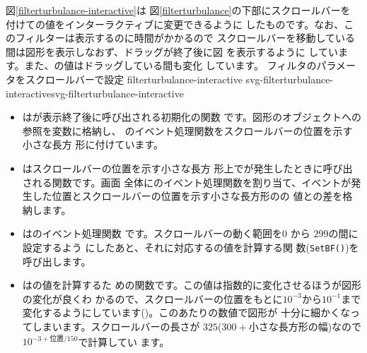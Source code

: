    
図\ref{filterturbulance-interactive}は
図\ref{filterturbulance}の下部にスクロールバーを
付けての値をインターラクティブに変更できるように
したものです。なお、このフィルターは表示するのに時間がかかるので
スクロールバーを移動している間は図形を表示しなおず、ドラッグが終了後に図
を表示するように
しています。また、の値はドラッグしている間も変化
しています。
{フィルタのパラメータをスクロールバーで設定}
{filterturbulance-interactive}
{svg-filterturbulance-interactive}{svg-filterturbulance-interactive}
\begin{itemize}
 \item {}は\SVG が表示終了後に呼び出される初期化の関数
       です。図形のオブジェクトへの参照を変数に格納し、
       のイベント処理関数をスクロールバーの位置を示す小さな長方
       形に付けています。
 \item {}はスクロールバーの位置を示す小さな長方
       形上でが発生したときに呼び出される関数です。画面
       全体にのイベント処理関数を割り当て、イベントが発
       生した位置とスクロールバーの位置を示す小さな長方形のの
       値との差を格納します。
 \item {}はのイベント処理関数
       です。スクロールバーの動く範囲を$0$ から $299$の間に設定するよう
       にしたあと、それに対応するの値を計算する関
       数(\texttt{SetBF()})を呼び出します。
 \item {}はの値を計算するた
       めの関数です。この値は指数的に変化させるほうが図形の変化が良くわ
       かるので、スクロールバーの位置をもとに$10^{-3}$から$10^{-1}$まで
       変化するようにしています()。このあたりの数値で図形が
       十分に細かくなってしまいます。スクロールバーの長さが
       $325$($300+小さな長方形の幅$)なので$10^{-3+位置/150}$で計算してい
       ます。


\end{itemize}
